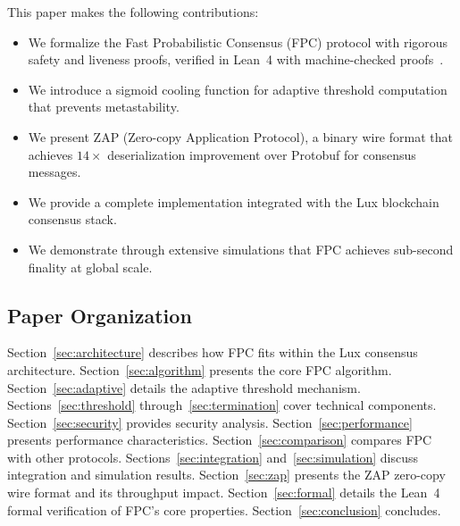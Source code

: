 This paper makes the following contributions:

\begin{itemize}
\item We formalize the Fast Probabilistic Consensus (FPC) protocol with rigorous safety and liveness proofs, verified in Lean~4 with machine-checked proofs~\cite{luxformal2025}.
\item We introduce a sigmoid cooling function for adaptive threshold computation that prevents metastability.
\item We present ZAP (Zero-copy Application Protocol), a binary wire format that achieves $14\times$ deserialization improvement over Protobuf for consensus messages.
\item We provide a complete implementation integrated with the Lux blockchain consensus stack.
\item We demonstrate through extensive simulations that FPC achieves sub-second finality at global scale.
\end{itemize}

\subsection{Paper Organization}

Section~\ref{sec:architecture} describes how FPC fits within the Lux consensus architecture. Section~\ref{sec:algorithm} presents the core FPC algorithm. Section~\ref{sec:adaptive} details the adaptive threshold mechanism. Sections~\ref{sec:threshold} through~\ref{sec:termination} cover technical components. Section~\ref{sec:security} provides security analysis. Section~\ref{sec:performance} presents performance characteristics. Section~\ref{sec:comparison} compares FPC with other protocols. Sections~\ref{sec:integration} and~\ref{sec:simulation} discuss integration and simulation results. Section~\ref{sec:zap} presents the ZAP zero-copy wire format and its throughput impact. Section~\ref{sec:formal} details the Lean~4 formal verification of FPC's core properties. Section~\ref{sec:conclusion} concludes.

